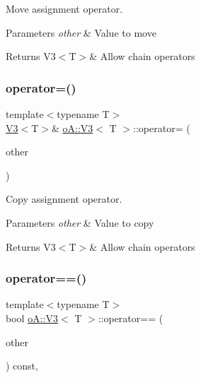 Move assignment operator. 


\begin{DoxyParams}{Parameters}
{\em other} & Value to move \\
\hline
\end{DoxyParams}
\begin{DoxyReturn}{Returns}
V3$<$\+T$>$\& Allow chain operators 
\end{DoxyReturn}
\mbox{\label{structo_a_1_1_v3_acd2b2489386aa3c917d2b843602da1a8}} 
\subsubsection{\texorpdfstring{operator=()}{operator=()}\hspace{0.1cm}{\footnotesize\ttfamily [2/2]}}
{\footnotesize\ttfamily template$<$typename T$>$ \\
\mbox{\hyperlink{structo_a_1_1_v3}{V3}}$<$T$>$\& \mbox{\hyperlink{structo_a_1_1_v3}{o\+A\+::\+V3}}$<$ T $>$\+::operator= (\begin{DoxyParamCaption}\item[{const \mbox{\hyperlink{structo_a_1_1_v3}{o\+A\+::\+V3}}$<$ T $>$ \&}]{other }\end{DoxyParamCaption})\hspace{0.3cm}{\ttfamily [inline]}}



Copy assignment operator. 


\begin{DoxyParams}{Parameters}
{\em other} & Value to copy \\
\hline
\end{DoxyParams}
\begin{DoxyReturn}{Returns}
V3$<$\+T$>$\& Allow chain operators 
\end{DoxyReturn}
\mbox{\label{structo_a_1_1_v3_a1291b33d742ccbc7e5b30466c6baa50d}} 
\subsubsection{\texorpdfstring{operator==()}{operator==()}}
{\footnotesize\ttfamily template$<$typename T$>$ \\
bool \mbox{\hyperlink{structo_a_1_1_v3}{o\+A\+::\+V3}}$<$ T $>$\+::operator== (\begin{DoxyParamCaption}\item[{const \mbox{\hyperlink{structo_a_1_1_v3}{o\+A\+::\+V3}}$<$ T $>$ \&}]{other }\end{DoxyParamCaption}) const\hspace{0.3cm}{\ttfamily [inline]}, {\ttfamily [noexcept]}}



